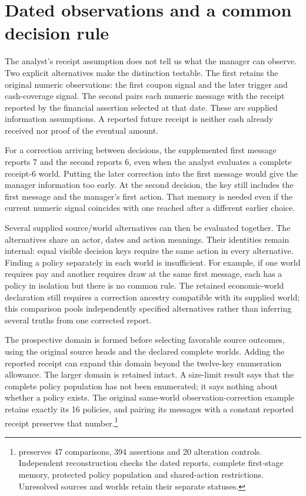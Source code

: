 \section{Dated observations and a common decision rule}
\label{sim:revised-source-actor-rules}

The analyst's receipt assumption does not tell us what the manager can observe. Two explicit alternatives make the distinction testable. The first retains the original numeric observations: the first coupon signal and the later trigger and cash-coverage signal. The second pairs each numeric message with the receipt reported by the financial assertion selected at that date. These are supplied information assumptions. A reported future receipt is neither cash already received nor proof of the eventual amount.

For a correction arriving between decisions, the supplemented first message reports 7 and the second reports 6, even when the analyst evaluates a complete receipt-6 world. Putting the later correction into the first message would give the manager information too early. At the second decision, the key still includes the first message and the manager's first action. That memory is needed even if the current numeric signal coincides with one reached after a different earlier choice.

Several supplied source/world alternatives can then be evaluated together. The alternatives share an actor, dates and action meanings. Their identities remain internal: equal visible decision keys require the same action in every alternative. Finding a policy separately in each world is insufficient. For example, if one world requires pay and another requires draw at the same first message, each has a policy in isolation but there is no common rule. The retained economic-world declaration still requires a correction ancestry compatible with its supplied world; this comparison pools independently specified alternatives rather than inferring several truths from one corrected report.

The prospective domain is formed before selecting favorable source outcomes, using the original source heads and the declared complete worlds. Adding the reported receipt can expand this domain beyond the twelve-key enumeration allowance. The larger domain is retained intact. A size-limit result says that the complete policy population has not been enumerated; it says nothing about whether a policy exists. The original same-world observation-correction example retains exactly its 16 policies, and pairing its messages with a constant reported receipt preserves that number.\footnote{ preserves 47 comparisons, 394 assertions and 20 alteration controls. Independent reconstruction checks the dated reports, complete first-stage memory, protected policy population and shared-action restrictions. Unresolved sources and worlds retain their separate statuses.}


